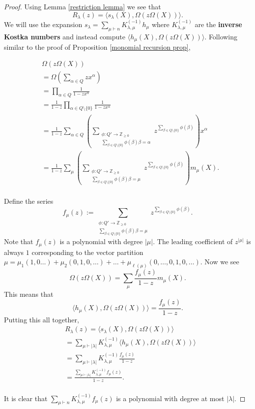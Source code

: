 \documentclass[10pt,a4paper]{amsart}
\begin{document}
\begin{proof}
Using Lemma \ref{restriction lemma} we see that 
$$R_{\lambda}(z) = \langle s_{\lambda}(X), \Omega\left(z \Omega(X) \right) \rangle.$$ We will use the expansion $s_{\lambda} = \sum_{\mu \vdash n} K^{(-1)}_{\lambda,\mu} h_{\mu}$ where $K^{(-1)}_{\lambda,\mu}$ are the \textbf{inverse Kostka numbers} and instead compute $\langle h_{\mu}(X), \Omega\left(z \Omega(X) \right) \rangle$. Following similar to the proof of Proposition \ref{monomial recursion prop}, 

\begin{align*}
    &\Omega\left(z\Omega(X) \right) \\
    &= \Omega\left( \sum_{\alpha \in Q} zx^{\alpha} \right)\\
    &= \prod_{\alpha \in Q} \frac{1}{1-zx^{\alpha}}\\
    &= \frac{1}{1-z}\prod_{\alpha \in Q\setminus \{0\}} \frac{1}{1-zx^{\alpha}}\\
    &= \frac{1}{1-z} \sum_{\alpha \in Q} \left( \sum_{\substack{\phi:Q'\rightarrow \mathbb{Z}_{\geq 0} \\ \sum_{\beta \in Q\setminus \{0\}} \phi(\beta)\beta = \alpha } } z^{\sum_{\beta \in Q\setminus \{0\}}\phi(\beta)}  \right) x^{\alpha }\\
    &= \frac{1}{1-z} \sum_{\mu} \left( \sum_{\substack{\phi:Q'\rightarrow \mathbb{Z}_{\geq 0} \\ \sum_{\beta \in Q\setminus \{0\}} \phi(\beta)\beta = \mu } } z^{\sum_{\beta \in Q\setminus \{0\}}\phi(\beta)}  \right) m_{\mu}(X).\\
\end{align*}

Define the series
$$f_{\mu}(z):= \sum_{\substack{\phi:Q'\rightarrow \mathbb{Z}_{\geq 0} \\ \sum_{\beta \in Q\setminus \{0\}} \phi(\beta)\beta = \mu } } z^{\sum_{\beta \in Q\setminus \{0\}}\phi(\beta)}.$$ Note that $f_{\mu}(z)$ is a polynomial with degree $|\mu|.$ The leading coefficient of $z^{|\mu|}$ is always $1$ corresponding to the vector partition $\mu= \mu_1(1,0\ldots) + \mu_2 (0,1,0,\ldots) + \ldots + \mu_{\ell(\mu)}(0,\ldots,0,1,0,\ldots)$. Now we see 
$$\Omega\left(z\Omega(X) \right) = \sum_{\mu} \frac{f_{\mu}(z)}{1-z} m_{\mu}(X).$$ This means that 
$$\langle h_{\mu}(X), \Omega\left(z\Omega(X) \right) \rangle = \frac{f_{\mu}(z)}{1-z}.$$ Putting this all together, 
\begin{align*}
    &R_{\lambda}(z) = \langle s_{\lambda}(X), \Omega\left(z \Omega(X) \right) \rangle\\
    &= \sum_{\mu\vdash |\lambda|} K^{(-1)}_{\lambda,\mu} \langle h_{\mu}(X), \Omega\left(z \Omega(X) \right) \rangle\\
    &= \sum_{\mu\vdash |\lambda|} K^{(-1)}_{\lambda,\mu} \frac{f_{\mu}(z)}{1-z}\\
    &= \frac{\sum_{\mu\vdash |\lambda|} K^{(-1)}_{\lambda,\mu} f_{\mu}(z)}{1-z}.\\
\end{align*}

It is clear that $\sum_{\mu\vdash n} K^{(-1)}_{\lambda,\mu} f_{\mu}(z)$ is a polynomial with degree at most $|\lambda|.$

\end{proof}
\end{document}
